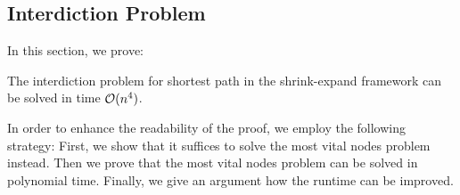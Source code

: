 \subsection{Interdiction Problem}
In this section, we prove: 

\begin{theorem}
\label{thm:shortest_path_interdiction}
The interdiction problem for shortest path in the shrink-expand framework can be solved in time $\mathcal{O}(n^4)$.
\end{theorem}

In order to enhance the readability of the proof, we employ the following strategy: First, we show that it suffices to solve the most vital nodes problem instead. Then we prove that the most vital nodes problem can be solved in polynomial time. Finally, we give an argument how the runtime can be improved.

